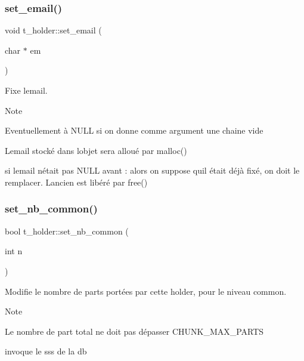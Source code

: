 \subsubsection{\texorpdfstring{set\+\_\+email()}{set\_email()}}
{\footnotesize\ttfamily void t\+\_\+holder\+::set\+\_\+email (\begin{DoxyParamCaption}\item[{char $\ast$}]{em }\end{DoxyParamCaption})}



Fixe l\textquotesingle{}email. 

\begin{DoxyNote}{Note}

\begin{DoxyItemize}
\item Eventuellement à N\+U\+LL si on donne comme argument une chaine vide
\item L\textquotesingle{}email stocké dans l\textquotesingle{}objet sera alloué par malloc()
\item si l\textquotesingle{}email n\textquotesingle{}était pas N\+U\+LL avant \+: alors on suppose qu\textquotesingle{}il était déjà fixé, on doit le remplacer. L\textquotesingle{}ancien est libéré par free() 
\end{DoxyItemize}
\end{DoxyNote}
\mbox{\label{classt__holder_a0161af13d174c68725a401f12c1c2232}} 
\subsubsection{\texorpdfstring{set\+\_\+nb\+\_\+common()}{set\_nb\_common()}}
{\footnotesize\ttfamily bool t\+\_\+holder\+::set\+\_\+nb\+\_\+common (\begin{DoxyParamCaption}\item[{int}]{n }\end{DoxyParamCaption})}



Modifie le nombre de parts portées par cette holder, pour le niveau common. 

\begin{DoxyNote}{Note}

\begin{DoxyItemize}
\item Le nombre de part total ne doit pas dépasser C\+H\+U\+N\+K\+\_\+\+M\+A\+X\+\_\+\+P\+A\+R\+TS
\item invoque le sss de la db 
\end{DoxyItemize}
\end{DoxyNote}
\mbox{\label{classt__holder_abd1722834ceb39539af2444612f28760}} 
